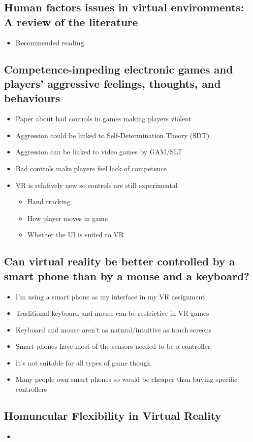 \documentclass{scrartcl}
\begin{document}
\subsection{Human factors issues in virtual environments: A review of the literature \cite{stanney}}

\begin{itemize}
	\item Recommended reading 	
\end{itemize}

\subsection{Competence-impeding electronic games and players’ aggressive feelings, thoughts, and behaviours \cite{przybylski}}

\begin{itemize}
	\item Paper about bad controls in games making players violent 
	\item Aggression could be linked to Self-Determination Theory (SDT) 
	\item Aggression can be linked to video games by GAM/SLT
	\item Bad controls make players feel lack of competence
	\item VR is relatively new so controls are still experimental
	\begin{itemize}
		\item Hand tracking
		\item How player moves in game
		\item Whether the UI is suited to VR
	\end{itemize}	
\end{itemize}

\subsection{Can virtual reality be better controlled by a smart phone than by a mouse and a keyboard? \cite{Kovarova}}

\begin{itemize}
	\item I'm using a smart phone as my interface in my VR assignment	
	\item Traditional keyboard and mouse can be restrictive in VR games
	\item Keyboard and mouse aren't as natural/intuitive as touch screens
	\item Smart phones have most of the sensors needed to be a controller 
	\item It's not suitable for all types of game though
	\item Many people own smart phones so would be cheaper than buying specific controllers
\end{itemize}

\subsection{Homuncular Flexibility in Virtual Reality \cite{won2015homuncular}}

\begin{itemize}
	\item 
\end{itemize}

	


	
\end{document}
